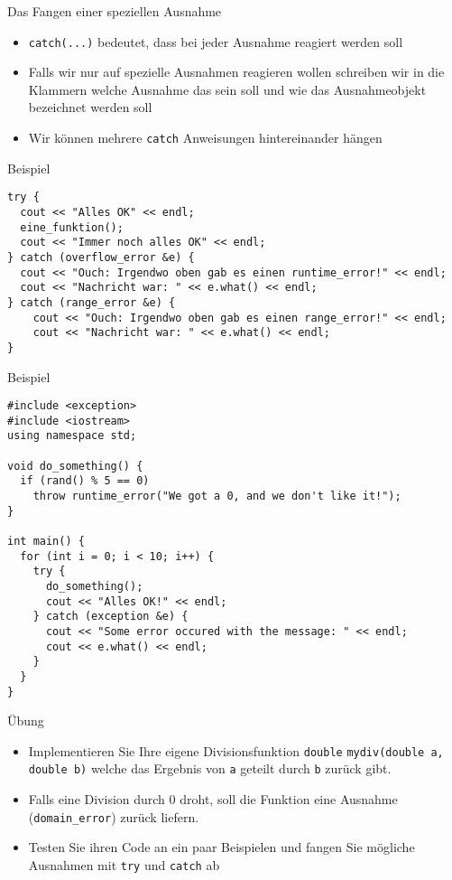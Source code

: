 \documentclass[presentation]{beamer}
\begin{document}
\begin{frame}[label={sec:orgc2cd740},fragile]{Das Fangen einer speziellen Ausnahme}
 \begin{itemize}
\item {\color{solarizedYellow}\verb!catch(...)!} bedeutet, dass bei \alert{jeder Ausnahme} reagiert werden
soll
\item Falls wir nur auf \alert{spezielle Ausnahmen} reagieren wollen schreiben
wir in die Klammern \alert{welche Ausnahme} das sein soll und wie das
Ausnahmeobjekt bezeichnet werden soll
\item Wir können mehrere {\color{solarizedYellow}\verb!catch!} Anweisungen hintereinander hängen
\end{itemize}
\begin{block}{Beispiel}
\begin{verbatim}
try {
  cout << "Alles OK" << endl;
  eine_funktion();
  cout << "Immer noch alles OK" << endl;
} catch (overflow_error &e) {
  cout << "Ouch: Irgendwo oben gab es einen runtime_error!" << endl;
  cout << "Nachricht war: " << e.what() << endl;
} catch (range_error &e) {
    cout << "Ouch: Irgendwo oben gab es einen range_error!" << endl;
    cout << "Nachricht war: " << e.what() << endl;
}
\end{verbatim}
\end{block}
\end{frame}
\begin{frame}[label={sec:org00c16b2},fragile]{Beispiel}
 \begin{verbatim}
#include <exception>
#include <iostream>
using namespace std;

void do_something() {
  if (rand() % 5 == 0)
    throw runtime_error("We got a 0, and we don't like it!");
}

int main() {
  for (int i = 0; i < 10; i++) {
    try {
      do_something();
      cout << "Alles OK!" << endl;
    } catch (exception &e) {
      cout << "Some error occured with the message: " << endl;
      cout << e.what() << endl;
    }
  }
}
\end{verbatim}
\end{frame}
\begin{frame}[label={sec:org3b9cc11},fragile]{Übung}
 \begin{itemize}
\item Implementieren Sie Ihre \alert{eigene Divisionsfunktion} {\color{solarizedYellow}\verb!double!
  \verb!mydiv(double a, double b)!} welche das Ergebnis von {\color{solarizedYellow}\verb!a!} geteilt durch
{\color{solarizedYellow}\verb!b!} zurück gibt.
\item Falls eine Division durch 0 droht, soll die Funktion eine Ausnahme
({\color{solarizedYellow}\verb!domain_error!}) zurück liefern.
\item Testen Sie ihren Code an ein paar Beispielen und fangen Sie mögliche
Ausnahmen mit {\color{solarizedYellow}\verb!try!} und {\color{solarizedYellow}\verb!catch!} ab
\end{itemize}
\end{frame}
\end{document}
